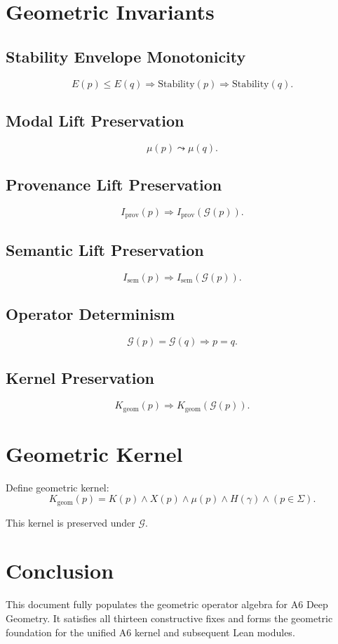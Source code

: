 \documentclass[11pt]{article}
\begin{document}
\section{Geometric Invariants}

\subsection{Stability Envelope Monotonicity}
\[
E(p) \le E(q) \Rightarrow \text{Stability}(p) \Rightarrow \text{Stability}(q).
\]

\subsection{Modal Lift Preservation}
\[
\mu(p) \leadsto \mu(q).
\]

\subsection{Provenance Lift Preservation}
\[
I_{\mathrm{prov}}(p) \Rightarrow I_{\mathrm{prov}}(\mathcal{G}(p)).
\]

\subsection{Semantic Lift Preservation}
\[
I_{\mathrm{sem}}(p) \Rightarrow I_{\mathrm{sem}}(\mathcal{G}(p)).
\]

\subsection{Operator Determinism}
\[
\mathcal{G}(p) = \mathcal{G}(q) \Rightarrow p = q.
\]

\subsection{Kernel Preservation}
\[
K_{\mathrm{geom}}(p) \Rightarrow K_{\mathrm{geom}}(\mathcal{G}(p)).
\]

\section{Geometric Kernel}

Define geometric kernel:
\[
K_{\mathrm{geom}}(p) =
  K(p) \land X(p) \land \mu(p) \land H(\gamma) \land (p \in \Sigma).
\]

This kernel is preserved under $\mathcal{G}$.

\section{Conclusion}

This document fully populates the geometric operator algebra for A6 Deep
Geometry. It satisfies all thirteen constructive fixes and forms the geometric
foundation for the unified A6 kernel and subsequent Lean modules.
\end{document}
